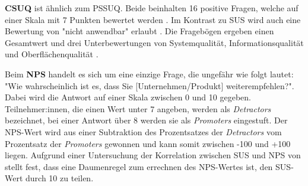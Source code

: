 \vspace{\baselineskip}

\textbf{\ac{CSUQ}} ist ähnlich zum \ac{PSSUQ}. Beide beinhalten 16 positive Fragen, welche auf einer Skala mit 7 Punkten bewertet werden \parencite{barnumUsabilityTesting2021}. Im Kontrast zu \ac{SUS} wird auch eine Bewertung von "nicht anwendbar" erlaubt \parencite{barnumUsabilityTesting2021}. Die Fragebögen ergeben einen Gesamtwert und drei Unterbewertungen von Systemqualität, Informationsqualität und Oberflächenqualität \parencite{lewisIBMComputer1995}.

\vspace{\baselineskip}

Beim \textbf{\ac{NPS}} handelt es sich um eine einzige Frage, die ungefähr wie folgt lautet: "Wie wahrscheinlich ist es, dass Sie [Unternehmen/Produkt] weiterempfehlen?". Dabei wird die Antwort auf einer Skala zwischen 0 und 10 gegeben. Teilnehmer:innen, die einen Wert unter 7 angeben, werden als \textit{Detractors} bezeichnet, bei einer Antwort über 8 werden sie als \textit{Promoters} eingestuft. Der \ac{NPS}-Wert wird aus einer Subtraktion des Prozentsatzes der \textit{Detractors} vom Prozentsatz der \textit{Promoters} gewonnen und kann somit zwischen -100 und +100 liegen. Aufgrund einer Untersuchung der Korrelation zwischen \ac{SUS} und \ac{NPS} von \textcite{sauroDoesBetter2010} stellt \textcite{barnumUsabilityTesting2021} fest, dass eine Daumenregel zum errechnen des \ac{NPS}-Wertes ist, den \ac{SUS}-Wert durch 10 zu teilen.
